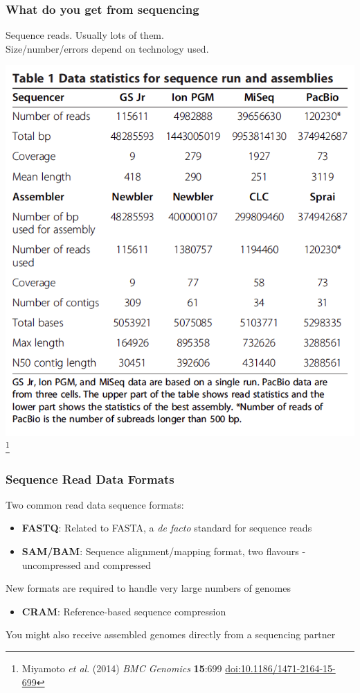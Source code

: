 
\begin{frame}
  \frametitle{What do you get from sequencing}
  Sequence reads. Usually lots of them. \\
  Size/number/errors depend on technology used.
    \begin{center}
      \includegraphics[height=0.6\textheight]{images/miyamoto_table}\footnote{\tiny{Miyamoto \textit{et al}. (2014) \textit{BMC Genomics} \textbf{15}:699 \href{http://dx.doi.org/10.1186/1471-2164-15-699}{doi:10.1186/1471-2164-15-699}}}
    \end{center}   
\end{frame}

\begin{frame}
  \frametitle{Sequence Read Data Formats}
  Two common read data sequence formats:
  \begin{itemize}
    \item \textbf{FASTQ}: Related to FASTA, a \textit{de facto} standard for sequence reads
    \item \textbf{SAM/BAM}: Sequence alignment/mapping format, two flavours - uncompressed and compressed
  \end{itemize}
  New formats are required to handle very large numbers of genomes
  \begin{itemize}
    \item \textbf{CRAM}: Reference-based sequence compression
  \end{itemize}
  You might also receive assembled genomes directly from a sequencing partner
\end{frame}

